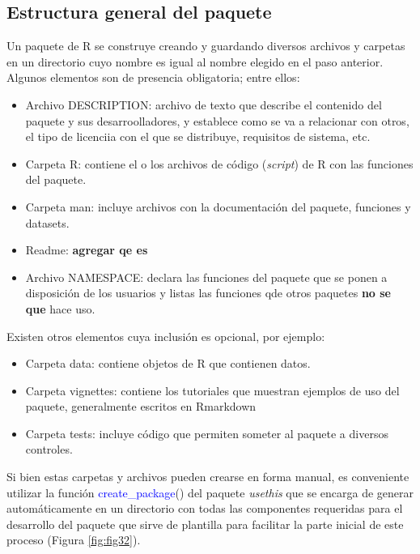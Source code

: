 \subsection{Estructura general del paquete}

Un paquete de R se construye creando y guardando diversos archivos y carpetas en un directorio cuyo nombre es igual al nombre elegido en el paso anterior. Algunos elementos son de presencia obligatoria; entre ellos:

\begin{itemize}
\item Archivo DESCRIPTION: archivo de texto que describe el contenido del paquete y sus desarroolladores, y establece como se va a relacionar con otros, el tipo de licenciia con el que se distribuye, requisitos de sistema, etc.
\item Carpeta R: contiene el o los archivos de código (\emph{script}) de R con las funciones del paquete.
\item Carpeta man: incluye archivos con la documentación del paquete, funciones y datasets.
\item Readme: \textbf{agregar qe es}
\item Archivo NAMESPACE: declara las funciones del paquete que se ponen a disposición de los usuarios y listas las funciones qde otros paquetes \textbf{ no se que} hace uso. 
\end{itemize}

Existen otros elementos cuya inclusión es opcional, por ejemplo:

\begin{itemize}
\item Carpeta data: contiene objetos de R que contienen datos.
\item Carpeta vignettes: contiene los tutoriales que muestran ejemplos de uso del paquete, generalmente escritos en Rmarkdown
\item Carpeta tests: incluye código que permiten someter al paquete a diversos controles.
\end{itemize}

Si bien estas carpetas y archivos pueden crearse en forma manual, es conveniente utilizar la función \textcolor{blue}{create\_package}() del paquete \emph{usethis} que se encarga de generar automáticamente en un directorio con todas las componentes requeridas para el desarrollo del paquete que sirve de plantilla para facilitar la parte inicial de este proceso (Figura \ref{fig:fig32}). 

